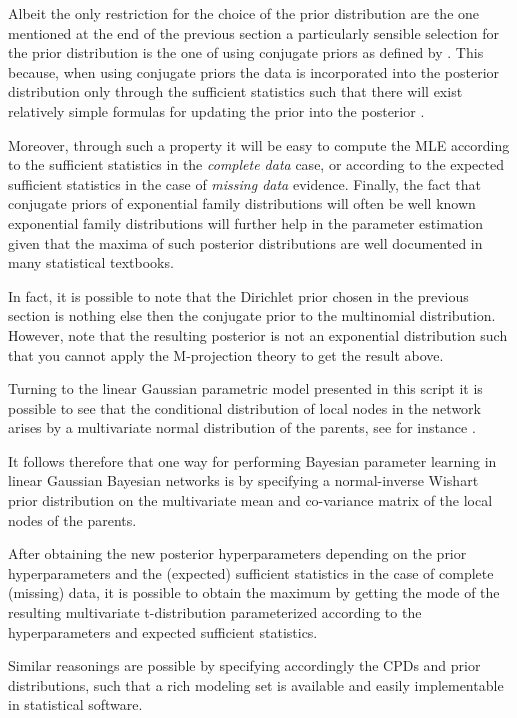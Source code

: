 \documentclass[11pt]{article}
\begin{document}
\begin{article}
Albeit the only restriction for the choice of the prior
distribution are the one mentioned at the end of the previous
section a particularly sensible selection for the prior
distribution is the one of using conjugate priors as defined by
\cite{schlaifer1961applied}. This because, when using conjugate
priors the data is incorporated into the posterior distribution
only through the sufficient statistics such that there will exist
relatively simple formulas for updating the prior into the
posterior \cite{fink1997compendium}.

Moreover, through such a property it will be easy to compute the
MLE according to the sufficient statistics in the \emph{complete data}
case, or according to the expected sufficient statistics in the
case of \emph{missing data} evidence. Finally, the fact that conjugate
priors of exponential family distributions will often be well
known exponential family distributions will further help in the
parameter estimation given that the maxima of such posterior
distributions are well documented in many statistical textbooks.

In fact, it is possible to note that the Dirichlet prior chosen in
the previous section is nothing else then the conjugate prior to
the multinomial distribution. However, note that the resulting
posterior is not an exponential distribution such that you cannot
apply the M-projection theory to get the result above.

Turning to the linear Gaussian parametric model presented in this
script it is possible to see that the conditional distribution
of local nodes in the network arises by a multivariate normal
distribution of the parents, see for instance
\cite{koller2009probabilistic}.

It follows therefore that one way for performing Bayesian parameter
learning in linear Gaussian Bayesian networks is by specifying a
normal-inverse Wishart prior distribution on the multivariate mean
and co-variance matrix of the local nodes of the parents.

After obtaining the new posterior hyperparameters depending on the
prior hyperparameters and the (expected) sufficient statistics in
the case of complete (missing) data, it is possible to obtain the
maximum by getting the mode of the resulting multivariate
t-distribution parameterized according to the hyperparameters and
expected sufficient statistics.

Similar reasonings are possible by specifying accordingly the CPDs
and prior distributions, such that a rich modeling set is
available and easily implementable in statistical software.


\end{article}
\end{document}
